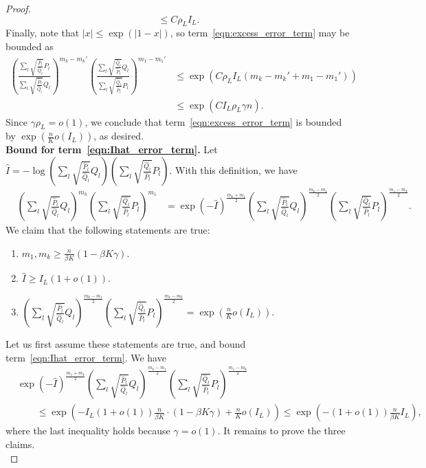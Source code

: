 \documentclass{article}
\begin{document}
\begin{proof}
\[\leq C\rho_LI_L. 
\]
Finally, note that $ |x| \leq \exp( | 1 - x | )$, so term~\eqref{eqn:excess_error_term} may be bounded as
\begin{align*}
  \left( \frac{\sum_l \sqrt{\frac{\hat{P}_l}{\hat{Q}_l} } P_l}
                {\sum_l \sqrt{\frac{\hat{P}_l}{\hat{Q}_l} } Q_l}  \right)^{m_k - m_k'}
 \left( \frac{ \sum_l \sqrt{\frac{\hat{Q}_l}{\hat{P}_l} } Q_l}
             { \sum_l \sqrt{\frac{\hat{Q}_l}{\hat{P}_l} } P_l} \right)^{m_1 - m_1'}  &\leq \exp\left( C \rho_L I_L (m_k - m_k' + m_1 - m_1')\right) \\
&\leq \exp( C I_L \rho_L \gamma n).
\end{align*}
Since $\gamma \rho_L = o(1)$,  we conclude that term~\eqref{eqn:excess_error_term} is bounded by $\exp \left( \frac{n}{K}o(I_L)\right)$, as desired.\\
 
\noindent \textbf{Bound for term~\eqref{eqn:Ihat_error_term}.} Let 
$\hat{I} = - \log \left( \sum_l \sqrt{\frac{\hat{P}_l}{\hat{Q}_l}} Q_l \right) \left( \sum_l \sqrt{\frac{\hat{Q}_l}{\hat{P}_l}} P_l \right) $. 
With this definition, we have
\begin{align*}
& \left( \sum_l \sqrt{\frac{\hat{P}_l}{\hat{Q}_l} } Q_l \right)^{m_k} 
       \left( \sum_l \sqrt{\frac{\hat{Q_l}}{\hat{P}_l} } P_l \right)^{m_1} 
&= \exp( - \hat{I} )^{\frac{m_k + m_1}{2}}  \left( \sum_l \sqrt{\frac{\hat{P}_l}{\hat{Q}_l}} Q_l \right)^{\frac{m_k - m_1}{2}} 
 \left( \sum_l \sqrt{\frac{\hat{Q}_l}{\hat{P}_l}} P_l \right)^{\frac{m_1 - m_k}{2}}.
\end{align*}
We claim that the following statements are true:
\begin{enumerate}
\item $ m_1, m_k \geq \frac{n}{\beta K} (1 -\beta K \gamma)$.
\item $\hat{I} \geq I_L(1 + o(1))$.
\item $\left( \sum_l \sqrt{\frac{\hat{P}_l}{\hat{Q}_l}} Q_l \right)^{\frac{m_k - m_1}{2}} 
 \left( \sum_l \sqrt{\frac{\hat{Q}_l}{\hat{P}_l}} P_l \right)^{\frac{m_1 - m_k}{2}} = \exp\left(\frac{n}{K}  o(I_L)\right)$.
\end{enumerate}
Let us first assume these statements are true, and bound term~\eqref{eqn:Ihat_error_term}. We have
\begin{align*}
& \exp( - \hat{I} )^{\frac{m_1 + m_k}{2}}  \left( \sum_l \sqrt{\frac{\hat{P}_l}{\hat{Q}_l}} Q_l \right)^{\frac{m_k - m_1}{2}} 
 \left( \sum_l \sqrt{\frac{\hat{Q}_l}{\hat{P}_l}} P_l \right)^{\frac{m_1 - m_k}{2}} \\
& \qquad \leq  \exp \left( - I_L(1+o(1)) \frac{n}{\beta K} \cdot (1 -\beta K \gamma) + \frac{n}{K} o(I_L)\right)  \leq \exp \left( - (1+o(1)) \frac{n}{\beta K} I_L  \right), 
\end{align*}
where the last inequality holds because $\gamma = o(1)$. It remains to prove the three claims.\\


\end{proof}
\end{document}
